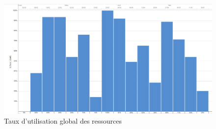         \begin{landscape}
            \begin{figure}
                \centering
                \includegraphics[height=0.70\textwidth]{figure/TauxUtilisation.png}
                \caption{Taux d'utilisation global des ressources}
                \label{fig:taux_utilisation}
            \end{figure}
        \end{landscape}